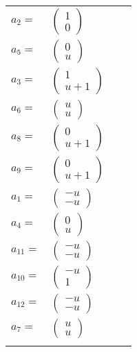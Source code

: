 \documentclass[1p]{elsarticle_modified}
\theoremstyle{definition}
\begin{document}
\begin{tabular}{m{7pt} m{180pt} m{7pt} m{180pt} }
\flushright $a_{2}=$&$\begin{pmatrix}1\\0\end{pmatrix}$ \\
\flushright $a_{5}=$&$\begin{pmatrix}0\\u\end{pmatrix}$ \\
\flushright $a_{3}=$&$\begin{pmatrix}1\\u+1\end{pmatrix}$ \\
\flushright $a_{6}=$&$\begin{pmatrix}u\\u\end{pmatrix}$ \\
\flushright $a_{8}=$&$\begin{pmatrix}0\\u+1\end{pmatrix}$ \\
\flushright $a_{9}=$&$\begin{pmatrix}0\\u+1\end{pmatrix}$ \\
\flushright $a_{1}=$&$\begin{pmatrix}- u\\- u\end{pmatrix}$ \\
\flushright $a_{4}=$&$\begin{pmatrix}0\\u\end{pmatrix}$ \\
\flushright $a_{11}=$&$\begin{pmatrix}- u\\- u\end{pmatrix}$ \\
\flushright $a_{10}=$&$\begin{pmatrix}- u\\1\end{pmatrix}$ \\
\flushright $a_{12}=$&$\begin{pmatrix}- u\\- u\end{pmatrix}$ \\
\flushright $a_{7}=$&$\begin{pmatrix}u\\u\end{pmatrix}$\\&\end{tabular}
\end{document}
